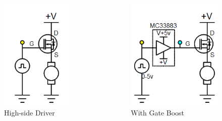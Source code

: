 \documentclass{beamer}
\begin{document}
\begin{frame}
\begin{columns}[t]
\begin{figure}
  \centering
  \includegraphics[scale=0.33]{images-dis3/driverckt-highside} \\
  High-side Driver
\end{figure}
\hfill \\
\pause
\begin{figure}
  \centering
  \includegraphics[scale=0.33]{images-dis3/driverckt-highside-boost} \\
  With Gate Boost
\end{figure}
\end{columns}
\end{frame}
\end{document}
